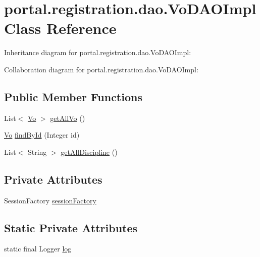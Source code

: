 \hypertarget{classportal_1_1registration_1_1dao_1_1VoDAOImpl}{
\section{portal.registration.dao.VoDAOImpl Class Reference}
\label{classportal_1_1registration_1_1dao_1_1VoDAOImpl}
}


Inheritance diagram for portal.registration.dao.VoDAOImpl:


Collaboration diagram for portal.registration.dao.VoDAOImpl:
\subsection*{Public Member Functions}
\begin{DoxyCompactItemize}
\item 
List$<$ \hyperlink{classportal_1_1registration_1_1domain_1_1Vo}{Vo} $>$ \hyperlink{classportal_1_1registration_1_1dao_1_1VoDAOImpl_af31fcf85409b93ccae3745d57844d4e3}{getAllVo} ()
\item 
\hyperlink{classportal_1_1registration_1_1domain_1_1Vo}{Vo} \hyperlink{classportal_1_1registration_1_1dao_1_1VoDAOImpl_ad7e3ba1a2bb558ac86421cd941332fde}{findById} (Integer id)
\item 
List$<$ String $>$ \hyperlink{classportal_1_1registration_1_1dao_1_1VoDAOImpl_a835ab0538757bee251c57acf0ff1d606}{getAllDiscipline} ()
\end{DoxyCompactItemize}
\subsection*{Private Attributes}
\begin{DoxyCompactItemize}
\item 
SessionFactory \hyperlink{classportal_1_1registration_1_1dao_1_1VoDAOImpl_ac5ec3502e9e6c89e2545a21c355d5b9d}{sessionFactory}
\end{DoxyCompactItemize}
\subsection*{Static Private Attributes}
\begin{DoxyCompactItemize}
\item 
static final Logger \hyperlink{classportal_1_1registration_1_1dao_1_1VoDAOImpl_aabbe1e1ee26e5a1a2b13c6d49b77449f}{log}
\end{DoxyCompactItemize}


